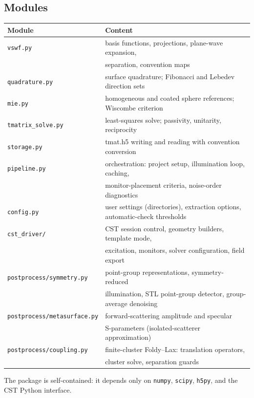 \documentclass[11pt]{article}
\begin{document}
\subsection{Modules}
\begin{center}
\begin{tabular}{ll}
\toprule
Module & Content\\
\midrule
\texttt{vswf.py} & basis functions, projections, plane-wave expansion,\\
 & separation, convention maps\\
\texttt{quadrature.py} & surface quadrature; Fibonacci and Lebedev
 direction sets\\
\texttt{mie.py} & homogeneous and coated sphere references;
 Wiscombe criterion\\
\texttt{tmatrix\_solve.py} & least-squares solve; passivity, unitarity,
 reciprocity\\
\texttt{storage.py} & tmat.h5 writing and reading with convention
 conversion\\
\texttt{pipeline.py} & orchestration: project setup, illumination loop,
 caching,\\
 & monitor-placement criteria, noise-order diagnostics\\
\texttt{config.py} & user settings (directories), extraction options,
 automatic-check thresholds\\
\texttt{cst\_driver/} & CST session control, geometry builders, template
 mode,\\
 & excitation, monitors, solver configuration, field export\\
\texttt{postprocess/symmetry.py} & point-group representations,
 symmetry-reduced\\
 & illumination, STL point-group detector, group-average denoising\\
\texttt{postprocess/metasurface.py} & forward-scattering amplitude and
 specular\\
 & S-parameters (isolated-scatterer approximation)\\
\texttt{postprocess/coupling.py} & finite-cluster Foldy--Lax:
 translation operators,\\
 & cluster solve, separation guards\\
\bottomrule
\end{tabular}
\end{center}
The package is self-contained: it depends only on \texttt{numpy},
\texttt{scipy}, \texttt{h5py}, and the CST Python interface.
\end{document}
